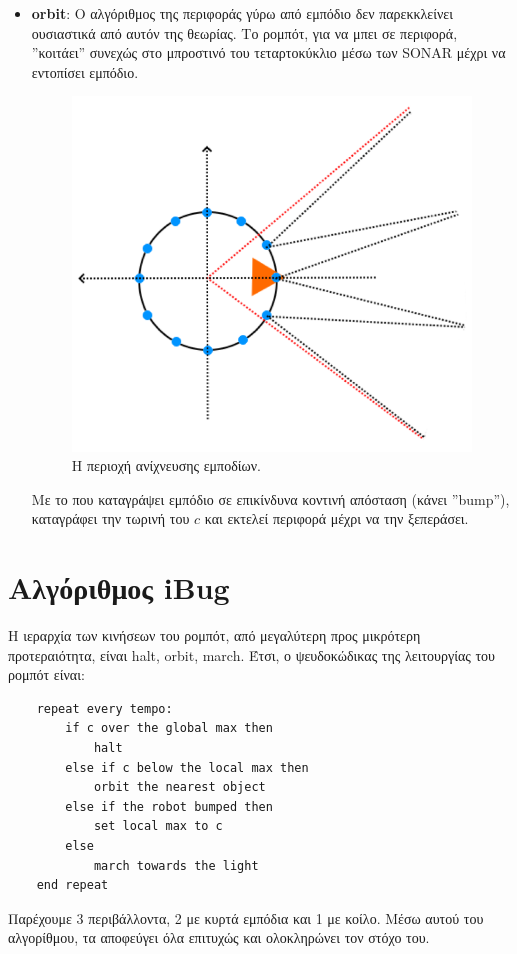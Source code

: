 \documentclass{article}
\newcommand{\lt}[1]{\latintext #1\greektext}
\newcommand{\blt}[1]{\lt{\textbf{#1}}}
\begin{document}
\begin{itemize}
    \newpage 
    
    \item \blt{orbit}: O αλγόριθμος της περιφοράς γύρω από εμπόδιο δεν παρεκκλείνει ουσιαστικά από αυτόν της θεωρίας. Το ρομπότ, για να μπει σε περιφορά, ''κοιτάει'' συνεχώς στο μπροστινό του τεταρτοκύκλιο μέσω των \lt{SONAR} μέχρι να εντοπίσει εμπόδιο.
    \begin{figure}[h]
        \centering
        \includegraphics[scale=0.5]{images/vision.png}
        \caption{Η περιοχή ανίχνευσης εμποδίων.}
        \label{fig:enter-label}
    \end{figure}
    Με το που καταγράψει εμπόδιο σε επικίνδυνα κοντινή απόσταση (κάνει ''\lt{bump}''), καταγράφει την τωρινή του $c$ και εκτελεί περιφορά μέχρι να την ξεπεράσει. 
\end{itemize}
    
\newpage

\section*{Αλγόριθμος \lt{iBug}}

Η ιεραρχία των κινήσεων του ρομπότ, από μεγαλύτερη προς μικρότερη προτεραιότητα, είναι \lt{halt, orbit, march}. Έτσι, ο ψευδοκώδικας της λειτουργίας του ρομπότ είναι:
{
    \latintext
    \large
    \begin{lstlisting}
    repeat every tempo:
        if c over the global max then 
            halt
        else if c below the local max then 
            orbit the nearest object
        else if the robot bumped then 
            set local max to c
        else
            march towards the light
    end repeat    
    \end{lstlisting}
}

Παρέχουμε 3 περιβάλλοντα, 2 με κυρτά εμπόδια και 1 με κοίλο. Μέσω αυτού του αλγορίθμου, τα αποφεύγει όλα επιτυχώς και ολοκληρώνει τον στόχο του.
    
    
    
\end{document}
